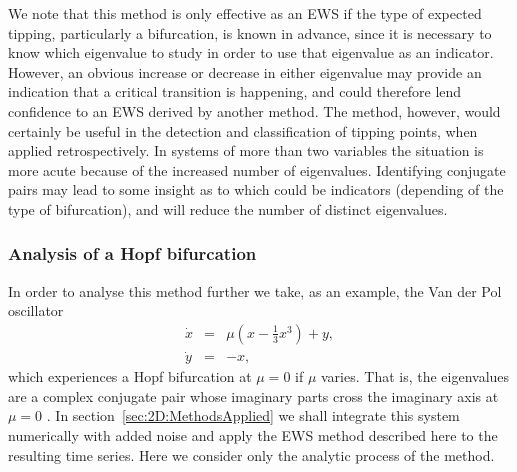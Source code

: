 We note that this method is only effective as an EWS if the type of expected tipping, particularly a bifurcation, is known in advance, since it is necessary to know which eigenvalue to study in order to use that eigenvalue as an indicator. However, an obvious increase or decrease in either eigenvalue may provide an indication that a critical transition is happening, and could therefore lend confidence to an EWS derived by another method. The method, however, would certainly be useful in the detection and classification of tipping points, when applied retrospectively. In systems of more than two variables the situation is more acute because of the increased number of eigenvalues. Identifying conjugate pairs may lead to some insight as to which could be indicators (depending of the type of bifurcation), and will reduce the number of distinct eigenvalues. 

\subsubsection{Analysis of a Hopf bifurcation}
In order to analyse this method further we take, as an example, the Van der Pol oscillator 
	\begin{equation}
		\begin{array}{rcl}
			\dot{x} &=& \mu\left(x - \frac{1}{3}x^3\right)+y,\\
			\dot{y} &=& -x,
		\end{array}
	\label{eqn:2D:exampleVDP}
	\end{equation} 
which experiences a Hopf bifurcation at $\mu=0$ if $\mu$ varies. That is, the eigenvalues are a complex conjugate pair whose imaginary parts cross the imaginary axis at $\mu=0$ \citep{strogatz2014}. In section~\ref{sec:2D:MethodsApplied} we shall integrate this system numerically with added noise and apply the EWS method described here to the resulting time series. Here we consider only the analytic process of the method.

